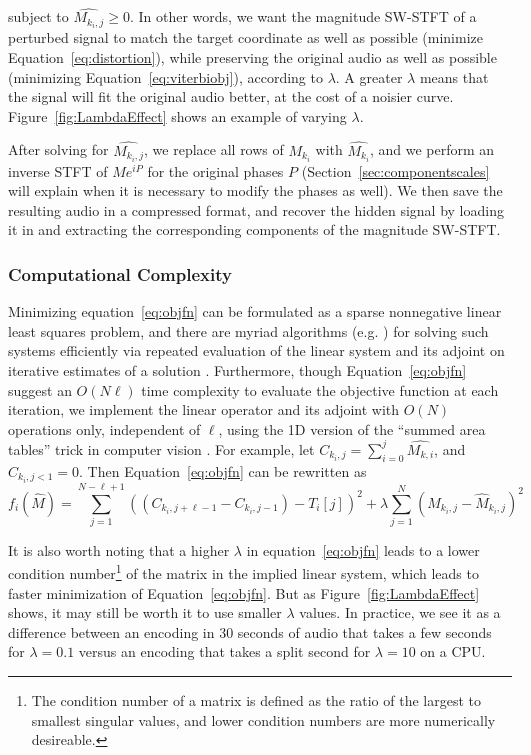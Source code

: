 \documentclass[runningheads]{llncs}
\begin{document}
subject to $\hat{M_{k_i, j}} \geq 0$.  In other words, we want the magnitude SW-STFT of a perturbed signal to match the target coordinate as well as possible (minimize Equation~\ref{eq:distortion}), while preserving the original audio as well as possible (minimizing Equation~\ref{eq:viterbiobj}), according to $\lambda$.  A greater $\lambda$ means that the signal will fit the original audio better, at the cost of a noisier curve.  Figure~\ref{fig:LambdaEffect} shows an example of varying $\lambda$.

After solving for $\hat{M_{k_i, j}}$, we replace all rows of $M_{k_i}$ with $\hat{M_{k_i}}$, and we perform an inverse STFT of $M e^{i P}$ for the original phases $P$ (Section~\ref{sec:componentscales} will explain when it is necessary to modify the phases as well).  We then save the resulting audio in a compressed format, and recover the hidden signal by loading it in and extracting the corresponding components of the magnitude SW-STFT.


\subsubsection{Computational Complexity}
\label{sec:computation}
Minimizing equation~\ref{eq:objfn} can be formulated as a sparse nonnegative linear least squares problem, and there are myriad algorithms (e.g. \cite{branch1999subspace}) for solving such systems efficiently via repeated evaluation of the linear system and its adjoint on iterative estimates of a solution .  Furthermore, though Equation~\ref{eq:objfn} suggest an $O(N \ell)$ time complexity to evaluate the objective function at each iteration, we implement the linear operator and its adjoint with $O(N)$ operations only, independent of $\ell$, using the 1D version of the ``summed area tables'' trick in computer vision \cite{lewisfast}.  For example, let $C_{k_i, j} = \sum_{i=0}^{j} \hat{M_{k, i}}$, and $C_{k_i, j < 1} = 0$.  Then Equation~\ref{eq:objfn} can be rewritten as 
\begin{equation}
  \label{eq:objfncumusum}
  f_i(\hat{M}) = \sum_{j=1}^{N-\ell+1} \left( (C_{k_i, j+\ell-1}-C_{k_i, j-1}) - T_i[j] \right)^2 + \lambda \sum_{j=1}^N \left( M_{k_i, j} - \hat{M}_{k_i, j} \right)^2
\end{equation}


It is also worth noting that a higher $\lambda$ in equation~\ref{eq:objfn} leads to a lower condition number\footnote{The condition number of a matrix is defined as the ratio of the largest to smallest singular values, and lower condition numbers are more numerically desireable.} of the matrix in the implied linear system, which leads to faster minimization of Equation~\ref{eq:objfn}.  But as Figure~\ref{fig:LambdaEffect} shows, it may still be worth it to use smaller $\lambda$ values.  In practice, we see it as a difference between an encoding in 30 seconds of audio that takes a few seconds for $\lambda=0.1$ versus an encoding that takes a split second for $\lambda=10$ on a CPU.
\end{document}
